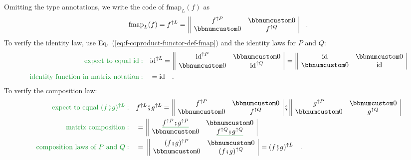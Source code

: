 Omitting the type annotations, we write the code of $\text{fmap}_{L}(f)$
as
\begin{equation}
\text{fmap}_{L}(f)=f^{\uparrow L}=\,\begin{array}{||cc|}
f^{\uparrow P} & \bbnum 0\\
\bbnum 0 & f^{\uparrow Q}
\end{array}\quad.\label{eq:f-coproduct-functor-def-fmap}
\end{equation}
To verify the identity law, use Eq.~(\ref{eq:f-coproduct-functor-def-fmap})
and the identity laws for $P$ and $Q$:
\begin{align*}
{\color{greenunder}\text{expect to equal }\text{id}:}\quad & \text{id}^{\uparrow L}=\,\begin{array}{||cc|}
\text{id}^{\uparrow P} & \bbnum 0\\
\bbnum 0 & \text{id}^{\uparrow Q}
\end{array}\,=\,\begin{array}{||cc|}
\text{id} & \bbnum 0\\
\bbnum 0 & \text{id}
\end{array}\\
{\color{greenunder}\text{identity function in matrix notation}:}\quad & =\text{id}\quad.
\end{align*}
To verify the composition law:
\begin{align*}
{\color{greenunder}\text{expect to equal }(f\bef g)^{\uparrow L}:}\quad & f^{\uparrow L}\bef g^{\uparrow L}=\,\begin{array}{||cc|}
f^{\uparrow P} & \bbnum 0\\
\bbnum 0 & f^{\uparrow Q}
\end{array}\,\bef\,\begin{array}{||cc|}
g^{\uparrow P} & \bbnum 0\\
\bbnum 0 & g^{\uparrow Q}
\end{array}\\
{\color{greenunder}\text{matrix composition}:}\quad & =\,\begin{array}{||cc|}
\gunderline{f^{\uparrow P}\bef g^{\uparrow P}} & \bbnum 0\\
\bbnum 0 & \gunderline{f^{\uparrow Q}\bef g^{\uparrow Q}}
\end{array}\\
{\color{greenunder}\text{composition laws of }P\text{ and }Q:}\quad & =\,\,\begin{array}{||cc|}
(f\bef g)^{\uparrow P} & \bbnum 0\\
\bbnum 0 & (f\bef g)^{\uparrow Q}
\end{array}\,=(f\bef g)^{\uparrow L}\quad.
\end{align*}

